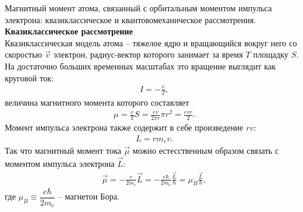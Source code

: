 \documentclass[__main__.tex]{subfiles}
\begin{document}
Магнитный момент атома, связанный с орбитальным моментом импульса электрона: квазиклассическое и квантовомеханическое рассмотрения.\\ 

\textbf{Квазиклассическое рассмотрение}\\
Квазиклассическая модель атома -- тяжелое ядро и вращающийся вокруг него со скоростью $\vec{v}$ электрон, радиус-вектор которого занимает за время $T$ площадку $S$. На достаточно больших временных масштабах это вращение выглядит как круговой ток:
\begin{gather*}
I=-\frac{e}{T},
\end{gather*}
величина магнитного момента которого составляет
\begin{gather*}
\mu=\frac{e}{T}S=\frac{ev}{2\pi r}\pi r^2=\frac{evr}{2}.
\end{gather*}
Момент импульса электрона также содержит в себе произведение $rv$:
\begin{gather*}
L=rm_ev.
\end{gather*}
Так что магнитный момент тока $\vec{\mu}$ можно естесственным образом связать с моментом импульса электрона $\vec{L}$:
\begin{gather*}
\vec{\mu}=-\frac{e}{2m_e}\vec{L}=-\frac{e\hbar}{2m_e}\frac{\vec{L}}{\hbar} =\mu_B\frac{\vec{L}}{\hbar},
\end{gather*}
где $\mu_B\equiv \dfrac{e\hbar}{2m_e}$ -- магнетон Бора.\\
\end{document}
